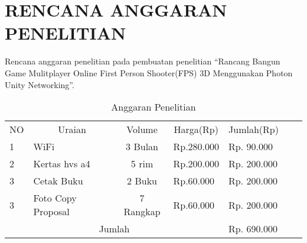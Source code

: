 \chapter*{RENCANA ANGGARAN PENELITIAN}
Rencana anggaran penelitian pada pembuatan penelitian “Rancang Bangun Game Mulitplayer Online First Person Shooter(FPS) 3D Menggunakan Photon Unity Networking”.

\begin{table}[h]
    \centering
    \begin{tabular}{|llcl|l|ll}
    \cline{1-5}
    \multicolumn{1}{|c|}{NO} & \multicolumn{1}{c|}{Uraian}          & \multicolumn{1}{c|}{Volume}  & \multicolumn{1}{c|}{Harga(Rp)} & Jumlah(Rp)    &  &  \\ \cline{1-5}
    \multicolumn{1}{|l|}{1}  & \multicolumn{1}{l|}{WiFi}           & \multicolumn{1}{c|}{3 Bulan} & Rp.280.000                      & Rp. 90.000  &  &  \\ \cline{1-5}
    \multicolumn{1}{|l|}{2}  & \multicolumn{1}{l|}{Kertas hvs a4}           & \multicolumn{1}{c|}{5 rim} & Rp.200.000                      & Rp. 200.000   &  &  \\ \cline{1-5}
    \multicolumn{1}{|l|}{3}  & \multicolumn{1}{l|}{Cetak Buku}           & \multicolumn{1}{c|}{2 Buku} & Rp.60.000                      & Rp. 200.000   &  &  \\ \cline{1-5}
    \multicolumn{1}{|l|}{3}  & \multicolumn{1}{l|}{Foto Copy Proposal}           & \multicolumn{1}{c|}{7 Rangkap} & Rp.60.000                      & Rp. 200.000   &  &  \\ \cline{1-5}
    \multicolumn{4}{|c|}{Jumlah}                                                                                                    & Rp. 690.000 &  &  \\ \cline{1-5}
    \end{tabular}
    \caption{Anggaran Penelitian}
    \label{lab:label-anggaran}
    \end{table}